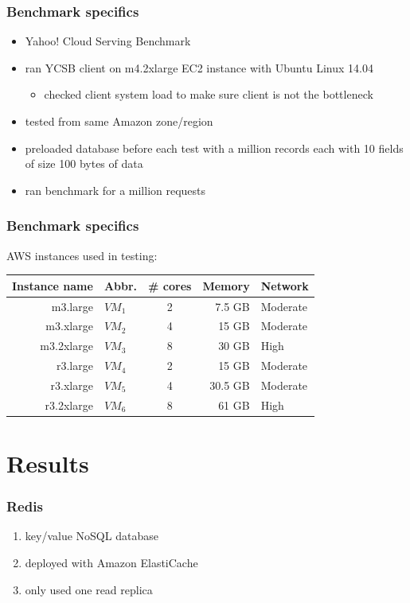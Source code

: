\documentclass{beamer}
\begin{document}
\begin{frame}
\frametitle{Benchmark specifics}
\begin{itemize}
\item Yahoo! Cloud Serving Benchmark 
\item ran YCSB client on m4.2xlarge EC2 instance with Ubuntu Linux 14.04
\begin{itemize}
\item checked client system load to make sure client is not the bottleneck
\end{itemize}
\item tested from same Amazon zone/region
\item preloaded database before each test with a million records each with 10 fields of size 100 bytes of data
\item ran benchmark for a million requests
\end{itemize}
\end{frame}

\begin{frame}
\frametitle{Benchmark specifics}
AWS instances used in testing:
\begin{table}
\begin{tabular}{|r|l|c|r|l|} \hline
Instance name & Abbr.& \# cores&Memory&Network\\ \hline
m3.large & $VM_1$ & 2 & 7.5 GB & Moderate\\ \hline
m3.xlarge & $VM_2$ & 4 & 15 GB & Moderate\\ \hline
m3.2xlarge & $VM_3$ & 8 & 30 GB & High\\ \hline
r3.large & $VM_4$ & 2 & 15 GB & Moderate\\ \hline
r3.xlarge & $VM_5$ & 4 & 30.5 GB & Moderate\\ \hline
r3.2xlarge & $VM_6$ & 8 & 61 GB & High\\ \hline
\hline\end{tabular}
\end{table}
\end{frame}

\section{Results}

\begin{frame}
\frametitle{Redis}
\begin{enumerate}
\item key/value NoSQL database
\item deployed with Amazon ElastiCache
\item only used one read replica
\end{enumerate}
\end{frame}
\end{document}

